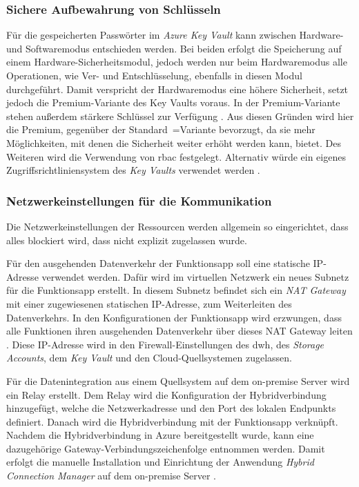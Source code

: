 \subsubsection{Sichere Aufbewahrung von Schlüsseln} \label{subsec:infra:konfig:keyVault}
Für die gespeicherten Passwörter im \textit{Azure Key Vault} kann zwischen Hardware- und Softwaremodus entschieden werden. Bei beiden erfolgt die Speicherung auf einem Hardware-Sicherheitsmodul, jedoch werden nur beim Hardwaremodus alle Operationen, wie Ver- und Entschlüsselung, ebenfalls in diesen Modul durchgeführt. Damit verspricht der Hardwaremodus eine höhere Sicherheit, setzt jedoch die Premium-Variante des Key Vaults voraus. In der Premium-Variante stehen außerdem stärkere Schlüssel zur Verfügung \cite{haunts_key_2019}. Aus diesen Gründen wird hier die Premium, gegenüber der Standard~=Variante bevorzugt, da sie mehr Möglichkeiten, mit denen die Sicherheit weiter erhöht werden kann, bietet. Des Weiteren wird die Verwendung von \ac{rbac} festgelegt. Alternativ würde ein eigenes Zugriffsrichtliniensystem des \textit{Key Vaults} verwendet werden \cite[vgl.][]{herath_azure_2022}.

\subsubsection{Netzwerkeinstellungen für die Kommunikation} \label{subsec:infra:konfig:netzwerk}
Die Netzwerkeinstellungen der Ressourcen werden allgemein so eingerichtet, dass alles blockiert wird, dass nicht explizit zugelassen wurde. 

Für den ausgehenden Datenverkehr der Funktionsapp soll eine statische IP-Adresse verwendet werden. Dafür wird  im virtuellen Netzwerk ein neues Subnetz für die Funktionsapp erstellt. In diesem Subnetz befindet sich ein \textit{NAT Gateway} mit einer zugewiesenen statischen IP-Adresse, zum Weiterleiten des Datenverkehrs. In den Konfigurationen der Funktionsapp wird erzwungen, dass alle Funktionen ihren ausgehenden Datenverkehr über dieses NAT Gateway leiten \cite[vgl.][]{msdoc_22_func_ip}. Diese IP-Adresse wird in den Firewall-Einstellungen des \ac{dwh}, des \textit{Storage Accounts}, dem \textit{Key Vault} und den Cloud-Quellsystemen zugelassen.

Für die Datenintegration aus einem Quellsystem auf dem on-premise Server wird ein Relay erstellt. Dem Relay wird die Konfiguration der Hybridverbindung hinzugefügt, welche die Netzwerkadresse und den Port des lokalen Endpunkts definiert. Danach wird die Hybridverbindung mit der Funktionsapp verknüpft. Nachdem die Hybridverbindung in Azure bereitgestellt wurde, kann eine dazugehörige Gateway-Verbindungszeichenfolge entnommen werden. Damit erfolgt die manuelle Installation und Einrichtung der Anwendung \textit{Hybrid Connection Manager} auf dem on-premise Server \cite[vgl.][]{msdoc_22_func_hybridConn}.

